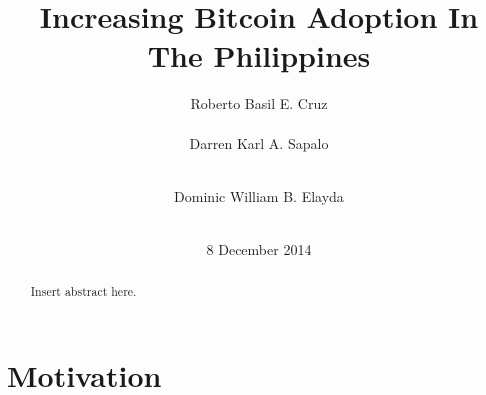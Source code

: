 \documentclass{acm_proc_article-sp}
\begin{document}
\title{Increasing Bitcoin Adoption In The Philippines}

\author{
\alignauthor
Roberto Basil E. Cruz\\
       \\
\alignauthor
\alignauthor
Darren Karl A. Sapalo\\
       \\
\and
\alignauthor Dominic William B. Elayda\\
       \\
}
\date{8 December 2014}

\maketitle
\begin{abstract}

Insert abstract here.

\end{abstract}



\section{Motivation}
\end{document}
